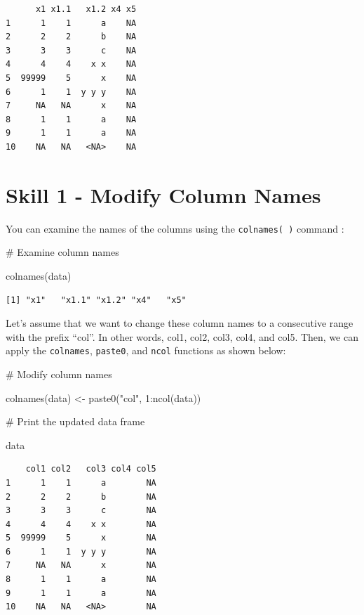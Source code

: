 \documentclass[
  letterpaper,
  DIV=11,
  numbers=noendperiod]{scrreprt}
\newenvironment{Shaded}{\begin{snugshade}}{\end{snugshade}}
\newcommand{\CommentTok}[1]{\textcolor[rgb]{0.37,0.37,0.37}{#1}}
\newcommand{\DecValTok}[1]{\textcolor[rgb]{0.68,0.00,0.00}{#1}}
\newcommand{\FunctionTok}[1]{\textcolor[rgb]{0.28,0.35,0.67}{#1}}
\newcommand{\NormalTok}[1]{\textcolor[rgb]{0.00,0.23,0.31}{#1}}
\newcommand{\OtherTok}[1]{\textcolor[rgb]{0.00,0.23,0.31}{#1}}
\newcommand{\SpecialCharTok}[1]{\textcolor[rgb]{0.37,0.37,0.37}{#1}}
\newcommand{\StringTok}[1]{\textcolor[rgb]{0.13,0.47,0.30}{#1}}
\begin{document}
\begin{verbatim}
      x1 x1.1   x1.2 x4 x5
1      1    1      a    NA
2      2    2      b    NA
3      3    3      c    NA
4      4    4    x x    NA
5  99999    5      x    NA
6      1    1  y y y    NA
7     NA   NA      x    NA
8      1    1      a    NA
9      1    1      a    NA
10    NA   NA   <NA>    NA
\end{verbatim}

\section*{Skill 1 - Modify Column
Names}\label{skill-1---modify-column-names}


You can examine the names of the columns using the \texttt{colnames(\ )}
command :

\begin{Shaded}
\begin{Highlighting}[]
\CommentTok{\# Examine column names}

\FunctionTok{colnames}\NormalTok{(data)}
\end{Highlighting}
\end{Shaded}

\begin{verbatim}
[1] "x1"   "x1.1" "x1.2" "x4"   "x5"  
\end{verbatim}

Let's assume that we want to change these column names to a consecutive
range with the prefix ``col''. In other words, col1, col2, col3, col4,
and col5. Then, we can apply the \texttt{colnames}, \texttt{paste0}, and
\texttt{ncol} functions as shown below:

\begin{Shaded}
\begin{Highlighting}[]
\CommentTok{\# Modify column names}

\FunctionTok{colnames}\NormalTok{(data) }\OtherTok{\textless{}{-}} \FunctionTok{paste0}\NormalTok{(}\StringTok{"col"}\NormalTok{, }\DecValTok{1}\SpecialCharTok{:}\FunctionTok{ncol}\NormalTok{(data))}

\CommentTok{\# Print the updated data frame}

\NormalTok{data}
\end{Highlighting}
\end{Shaded}

\begin{verbatim}
    col1 col2   col3 col4 col5
1      1    1      a        NA
2      2    2      b        NA
3      3    3      c        NA
4      4    4    x x        NA
5  99999    5      x        NA
6      1    1  y y y        NA
7     NA   NA      x        NA
8      1    1      a        NA
9      1    1      a        NA
10    NA   NA   <NA>        NA
\end{verbatim}
\end{document}
